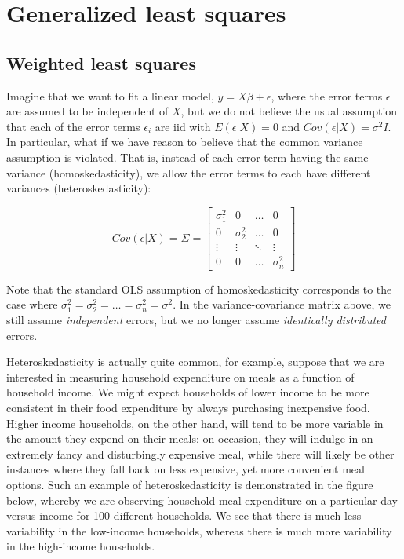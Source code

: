 

\chapter{Generalized least squares}
\label{ch:gls}



\section{Weighted least squares}

Imagine that we want to fit a linear model, $y = X\beta + \epsilon$, where the error terms $\epsilon$ are assumed to be independent of $X$, but we do not believe the usual assumption that each of the error terms $\epsilon_i$ are iid with $E(\epsilon | X) = 0$ and $Cov(\epsilon | X) = \sigma^2 I$. In particular, what if we have reason to believe that the common variance assumption is violated. That is, instead of each error term having the same variance (homoskedasticity), we allow the error terms to each have different variances (heteroskedasticity):

$$Cov(\epsilon | X) = \Sigma = \left[ \begin{array}{cccc} \sigma_1^2 & 0 & \dots & 0\\
 0 & \sigma_{2}^2 & \dots & 0\\
 \vdots & \vdots & \ddots & \vdots\\
 0 & 0 & \dots & \sigma_{n}^2\end{array} \right]$$
 
 
Note that the standard OLS assumption of homoskedasticity corresponds to the case where $\sigma_1^2 = \sigma_2^2 = \dots = \sigma_n^2 = \sigma^2$. In the variance-covariance matrix above, we still assume \textit{independent} errors, but we no longer assume \textit{identically distributed} errors.

Heteroskedasticity is actually quite common, for example, suppose that we are interested in measuring household expenditure on meals as a function of household income. We might expect households of lower income to be more consistent in their food expenditure by always purchasing inexpensive food. Higher income households, on the other hand, will tend to be more variable in the amount they expend on their meals: on occasion, they will indulge in an extremely fancy and disturbingly expensive meal, while there will likely be other instances where they fall back on less expensive, yet more convenient meal options. Such an example of heteroskedasticity is demonstrated in the figure below, whereby we are observing household meal expenditure on a particular day versus income for 100 different households. We see that there is much less variability in the low-income households, whereas there is much more variability in the high-income households.


